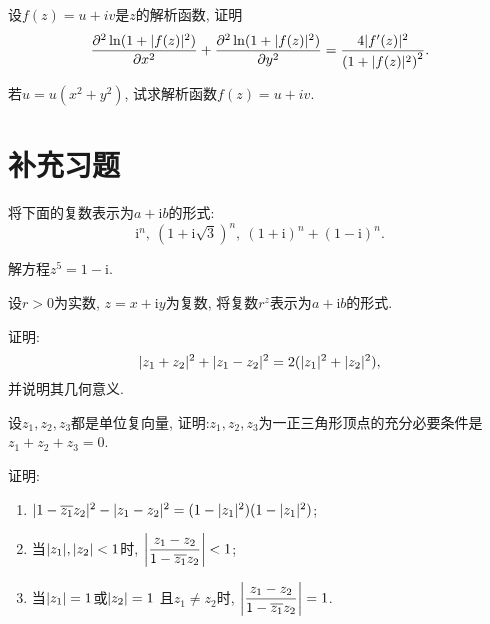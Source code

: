 \begin{yyEx}
	设$f(z) = u+iv$是$z$的解析函数, 证明\begin{equation*}
		\frac{\partial^2\ln(1+\lvert f(z)\rvert^2)}{\partial x^2} + \frac{\partial^2\ln(1+\lvert f(z)\rvert^2)}{\partial y^2} = \frac{4\lvert f'(z)\rvert^2}{\left(1+ \lvert f(z)\rvert^2\right)^2}.
	\end{equation*}
\end{yyEx}

\begin{yyEx}
	若$u = u(x^2+y^2)$, 试求解析函数$f(z) = u+iv$.
\end{yyEx}

\section{补充习题}

\begin{yyEx}
    将下面的复数表示为$a+\mathrm{i}b$的形式:\begin{equation*}
        \mathrm{i}^n,~(1+\mathrm{i}\sqrt{3})^n,~(1+\mathrm{i})^n+(1-\mathrm{i})^n.
    \end{equation*}
\end{yyEx}

\begin{yyEx}
    解方程$z^5 = 1-\mathrm{i}$.
\end{yyEx}

\begin{yyEx}
    设$r>0$为实数, $z=x+\mathrm{i}y$为复数, 将复数$r^z$表示为$a+\mathrm{i}b$的形式.
\end{yyEx}

\begin{yyEx}
    证明:
    \begin{equation*}
        \lvert z_1+z_2\rvert^2+\lvert z_1-z_2\rvert^2 = 2(\lvert z_1\rvert^2+\lvert z_2\rvert^2),
    \end{equation*}
    并说明其几何意义.
\end{yyEx}

\begin{yyEx}
    设$z_1,z_2,z_3$都是单位复向量, 证明:$z_1,z_2,z_3$为一正三角形顶点的充分必要条件是$z_1+z_2+z_3 = 0$.
\end{yyEx}

\begin{yyEx}
    证明:
    \begin{enumerate}
        \item  $\lvert1-\overline{z_1}z_2\rvert^2-\lvert z_1-z_2\rvert^2 = (1-\lvert z_1\rvert^2)(1-\lvert z_1\rvert^2)$;
        \item 当$\lvert z_1\rvert,\lvert z_2\rvert<1$时, 
        $\begin{lgathered}\left|\frac{z_1-z_2}{1-\overline{z_1}z_2}\right|<1\end{lgathered}$;
        \item 当$\lvert z_1\rvert = 1$或$\lvert z_2\rvert = 1$ 且$z_1\neq z_2$时, $\begin{lgathered}\left|\frac{z_1-z_2}{1-\overline{z_1}z_2}\right|=1\end{lgathered}$.
    \end{enumerate}
\end{yyEx}

